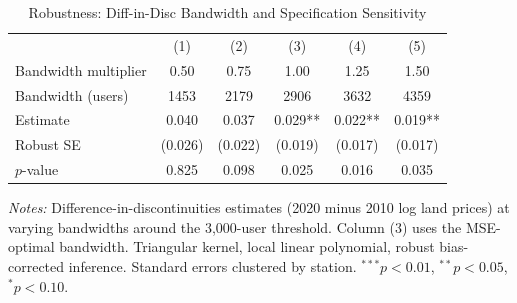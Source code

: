 \begin{table}[t]
\centering
\caption{Robustness: Diff-in-Disc Bandwidth and Specification Sensitivity}
\label{tab:robustness}
\begin{tabular}{lccccc}
\hline\hline
 & (1) & (2) & (3) & (4) & (5) \\
Bandwidth multiplier & 0.50 & 0.75 & 1.00 & 1.25 & 1.50 \\
\hline
Bandwidth (users) & 1453 & 2179 & 2906 & 3632 & 4359 \\
Estimate & 0.040 & 0.037 & 0.029** & 0.022** & 0.019** \\
Robust SE & (0.026) & (0.022) & (0.019) & (0.017) & (0.017) \\
$p$-value & 0.825 & 0.098 & 0.025 & 0.016 & 0.035 \\
\hline\hline
\end{tabular}
\begin{tablenotes}
\item \textit{Notes:} Difference-in-discontinuities estimates (2020 minus 2010 log land prices) at varying bandwidths around the 3,000-user threshold. Column (3) uses the MSE-optimal bandwidth. Triangular kernel, local linear polynomial, robust bias-corrected inference. Standard errors clustered by station. $^{***}p<0.01$, $^{**}p<0.05$, $^{*}p<0.10$.
\end{tablenotes}
\end{table}

